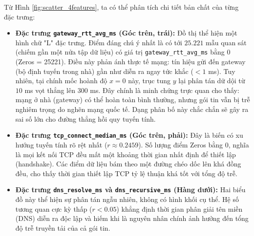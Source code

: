 Từ Hình \ref{fig:scatter_4features}, ta có thể phân tích chi tiết bản chất của từng đặc trưng:
\begin{itemize}
    \item \textbf{Đặc trưng \texttt{gateway\_rtt\_avg\_ms} (Góc trên, trái):} Đồ thị thể hiện một hình chữ "L" đặc trưng. Điểm đáng chú ý nhất là có tới $25.221$ mẫu quan sát (chiếm gần một nửa tập dữ liệu) có giá trị \texttt{gateway\_rtt\_avg\_ms} bằng $0$ (Zeros = 25221). Điều này phản ánh thực tế mạng: tín hiệu gửi đến gateway (bộ định tuyến trong nhà) gần như diễn ra ngay tức khắc ($< 1$ ms). Tuy nhiên, tại chính mốc hoành độ $x=0$ này, trục tung $y$ lại phân tán dữ dội từ $10$ ms vọt thẳng lên $300$ ms. Đây chính là minh chứng trực quan cho thấy: mạng ở nhà (gateway) có thể hoàn toàn bình thường, nhưng gói tin vẫn bị trễ nghiêm trọng do nghẽn mạng quốc tế. Dạng phân bố này chắc chắn sẽ gây ra sai số lớn cho đường thẳng hồi quy tuyến tính.
    
    \item \textbf{Đặc trưng \texttt{tcp\_connect\_median\_ms} (Góc trên, phải):} Đây là biến có xu hướng tuyến tính rõ rệt nhất ($r \approx 0.2459$). Số lượng điểm Zeros bằng $0$, nghĩa là mọi kết nối TCP đều mất một khoảng thời gian nhất định để thiết lập (handshake). Các điểm dữ liệu bám theo một đường chéo dốc lên khá đồng đều, cho thấy thời gian thiết lập TCP tỷ lệ thuận khá tốt với tổng độ trễ.
    
    \item \textbf{Đặc trưng \texttt{dns\_resolve\_ms} và \texttt{dns\_recursive\_ms} (Hàng dưới):} Hai biểu đồ này thể hiện sự phân tán ngẫu nhiên, không có hình khối cụ thể. Hệ số tương quan cực kỳ thấp ($r < 0.05$) khẳng định thời gian phân giải tên miền (DNS) diễn ra độc lập và hiếm khi là nguyên nhân chính ảnh hưởng đến tổng độ trễ truyền tải của cả gói tin.
\end{itemize}
